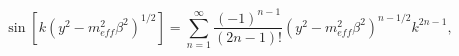 \begin{equation}
\sin \left[k\left(y^{2}-m_{eff}^{2}\beta ^{2}\right)^{1/2}\right]=\sum _{n=1}^{\infty }\frac{\left(-1\right)^{n-1}}{\left(2n-1\right)!}\left(y^{2}-m_{eff}^{2}\beta ^{2}\right)^{n-1/2}k^{2n-1},\label{sinetaylor}\end{equation}

